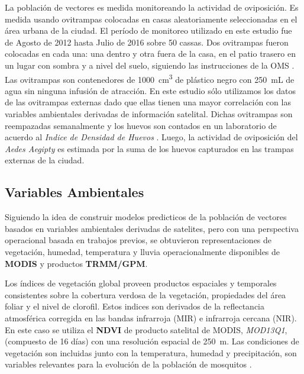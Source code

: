   \par La población de vectores es medida monitoreando la actividad de oviposición.
    Es medida usando ovitrampas colocadas en casas aleatoriamente seleccionadas
    en el área urbana de la ciudad. El período de monitoreo utilizado en este
    estudio fue de Agosto de 2012 hasta Julio de 2016 sobre 50 cassas. Dos
    ovitrampas fueron colocadas en cada una: una dentro y otra fuera de la casa,
    en el patio trasero en un lugar con sombra y a nivel del suelo, siguiendo
    las instrucciones de la OMS \cite{peridomestic}. Las ovitrampas son contenedores
    de \SI{1000}{\centi\meter\cubed} de plástico negro con \SI{250}{\milli\liter}
    de agua sin ninguna infusión de atracción.
    En este estudio sólo utilizamos los datos de las ovitrampas externas dado
    que ellas tienen una mayor correlación con las variables ambientales
    derivadas de información satelital. Dichas ovitrampas son reempazadas
    semanalmente y los huevos son contados en un laboratorio de acuerdo al
    \textit{Indice de Densidad de Huevos} \cite{indice_huevos}. Luego, la
    actividad de oviposición del \textit{Aedes Aegipty} es estimada por la suma
    de los huevos capturados en las trampas externas de la ciudad.



\subsection{Variables Ambientales}

  \par Siguiendo la idea de construir modelos predicticos de la población de
    vectores basados en variables ambientales derivadas de satelites, pero con una
    perspectiva operacional basada en trabajos previos, se obtuvieron representaciones
    de vegetación, humedad, temperatura y lluvia operacionalmente disponibles
    de \textbf{MODIS} y productos \textbf{TRMM/GPM}.

  \par Los índices de vegetación global proveen productos espaciales y
    temporales consistentes sobre la cobertura verdosa de la vegetación,
    propiedades del área foliar y el nivel de clorofil. Estos indices son
    derivados de la reflectancia atmosférica
    corregida en las bandas infrarroja (MIR) e infrarroja cercana (NIR).
    En este caso se utiliza el \textbf{NDVI} de producto satelital
    de MODIS, \textit{MOD13Q1}, (compuesto de 16 días) con una resolución espacial de
    \SI{250}{\meter}.
    Las condiciones de vegetación son incluidas junto con la temperatura,
    humedad y precipitación, son variables relevantes para la evolución de la
    población de mosquitos \cite{ndwi_erffectiveness, rs_invertebrate}.

